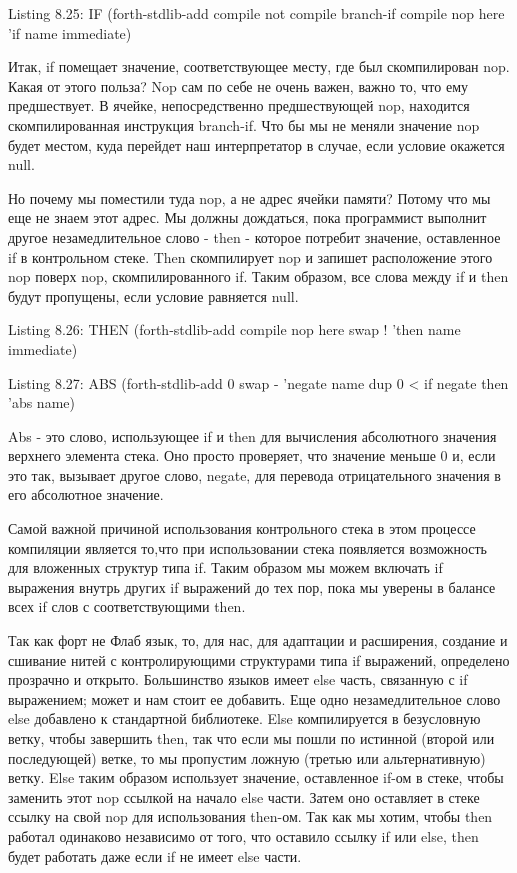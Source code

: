{{{Listing 8.25: IF
(forth-stdlib-add
{ compile not
compile branch-if
compile nop
here } ’if name immediate)

Итак, if помещает значение, соответствующее месту, где был скомпилирован nop. Какая от этого польза? Nop сам по себе не очень важен, важно то, что ему предшествует. В ячейке, непосредственно предшествующей nop, находится скомпилированная инструкция branch-if. Что бы мы не меняли значение nop будет местом, куда перейдет наш интерпретатор в случае, если условие окажется null.

Но почему мы поместили туда nop, а не адрес ячейки памяти? Потому что мы еще не знаем этот адрес. Мы должны дождаться, пока программист выполнит другое незамедлительное слово - then - которое потребит значение, оставленное if в контрольном стеке. Then скомпилирует nop и запишет расположение этого nop поверх nop, скомпилированного if. Таким образом, все слова между if и then будут пропущены, если условие равняется null.

Listing 8.26: THEN
(forth-stdlib-add
{ compile nop
here swap ! } ’then name immediate)

Listing 8.27: ABS
(forth-stdlib-add
{ 0 swap - } ’negate name
{ dup 0 < if negate then } ’abs name)

Abs - это слово, использующее if и then для вычисления абсолютного значения верхнего элемента стека. Оно просто проверяет, что значение меньше 0 и, если это так, вызывает другое слово, negate, для перевода отрицательного значения в его абсолютное значение.

Самой важной причиной использования контрольного стека в этом процессе компиляции является то,что при использовании стека появляется возможность для вложенных структур типа if. Таким образом мы можем включать if выражения внутрь других if выражений до тех пор, пока мы уверены в балансе всех if слов с соответствующими then.

Так как форт не Флаб язык, то, для нас, для адаптации и расширения, создание и сшивание нитей с контролирующими структурами типа if выражений, определено прозрачно и открыто. Большинство языков имеет else часть, связанную с if выражением; может и нам стоит ее добавить. Еще одно незамедлительное слово else добавлено к стандартной библиотеке. Else компилируется в безусловную ветку, чтобы завершить then, так что если мы пошли по истинной (второй или последующей) ветке, то мы пропустим ложную (третью или альтернативную) ветку. Else таким образом использует значение, оставленное if-ом в стеке, чтобы заменить этот nop ссылкой на начало else части. Затем оно оставляет в стеке ссылку на свой nop для использования then-ом. Так как мы хотим, чтобы then работал одинаково независимо от того, что оставило ссылку if или else, then будет работать даже если if не имеет else части.

}}}
